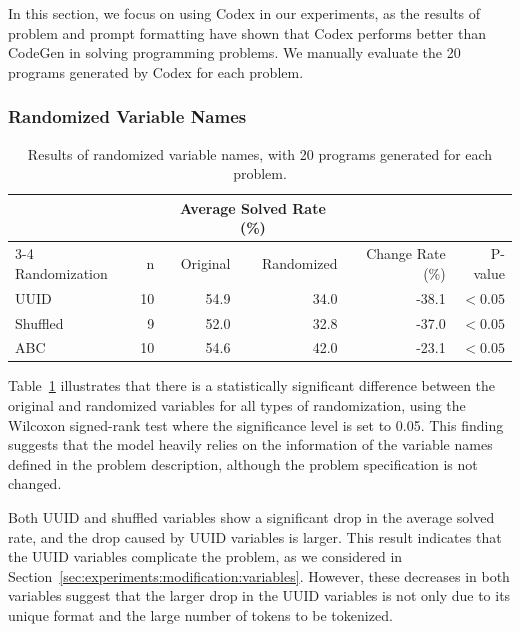 \documentclass{article}
\begin{document}
In this section, we focus on using Codex in our experiments, as the results of problem and prompt formatting have shown that Codex performs better than CodeGen in solving programming problems.
We manually evaluate the 20 programs generated by Codex for each problem.








\subsubsection{Randomized Variable Names}
\label{sec:results:modification:random-variables}



\begin{table}[ht]
\begin{center}
\begin{minipage}{0.83\linewidth}
    \caption{Results of randomized variable names, with 20 programs generated for each problem.}
    \label{table:randomized-variables-result}
    \begin{tabular*}{\linewidth}
    {lrrrrr}
        \toprule
        & & \multicolumn{2}{c}{Average Solved Rate (\%)} \\
        \cmidrule{3-4}
        Randomization & n & Original & Randomized & Change Rate (\%) & P-value \\
        \midrule
        UUID & 10 & 54.9 & 34.0 & -38.1 & $< 0.05$ \\ 
        Shuffled & 9 & 52.0 & 32.8 & -37.0 & $< 0.05$ \\ 
        ABC & 10 & 54.6 & 42.0 & -23.1 & $< 0.05$ \\ 
        \bottomrule
    \end{tabular*}
\end{minipage}
\end{center}
\end{table}

Table~\ref{table:randomized-variables-result} illustrates that there is a statistically significant difference between the original and randomized variables for all types of randomization, using the Wilcoxon signed-rank test where the significance level is set to 0.05.
This finding suggests that the model heavily relies on the information of the variable names defined in the problem description, although the problem specification is not changed.

Both UUID and shuffled variables show a significant drop in the average solved rate, and the drop caused by UUID variables is larger.
This result indicates that the UUID variables complicate the problem, as we considered in Section~\ref{sec:experiments:modification:variables}. 
However, these decreases in both variables suggest that the larger drop in the UUID variables is not only due to its unique format and the large number of tokens to be tokenized.
\end{document}
